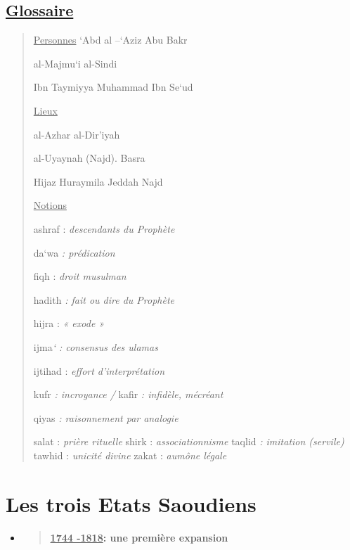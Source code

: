 \hypertarget{glossaire-1}{%
\subsection{\texorpdfstring{\underline{Glossaire}}{Glossaire}}\label{glossaire-1}}

\begin{quote}
\underline{Personnes} `Abd al --`Aziz Abu Bakr

al-Majmu`i al-Sindi

Ibn Taymiyya Muhammad Ibn Se`ud

\underline{Lieux}

al-Azhar al-Dir'iyah

al-Uyaynah (Najd). Basra

Hijaz Huraymila Jeddah Najd

\underline{Notions}

ashraf : \emph{descendants du Prophète}

da`wa \emph{: prédication}

fiqh : \emph{droit musulman}

hadith \emph{: fait ou dire du Prophète}

hijra : \emph{« exode »}

ijma\emph{` : consensus des ulamas}

ijtihad : \emph{effort d'interprétation}

kufr \emph{: incroyance /} kafir \emph{: infidèle, mécréant}

qiyas \emph{: raisonnement par analogie}

salat : \emph{prière rituelle} shirk : \emph{associationnisme} taqlid
\emph{: imitation (servile)} tawhid : \emph{unicité divine} zakat :
\emph{aumône légale}
\end{quote}

\hypertarget{les-trois-etats-saoudiens}{%
\section{Les trois Etats Saoudiens}\label{les-trois-etats-saoudiens}}

\begin{itemize}
\item
  \begin{quote}
  \textbf{\underline{1744 -1818}: une première expansion}
  \end{quote}
\end{itemize}

